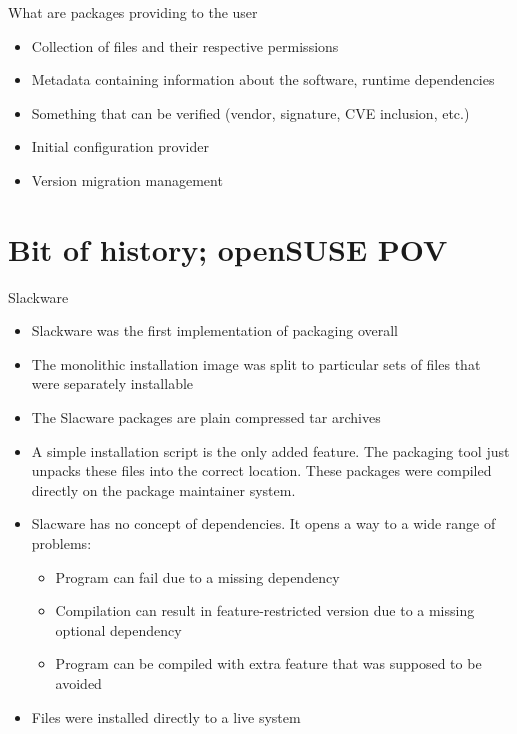 \documentclass{beamer}
\begin{document}
\begin{frame}[t]{What are packages providing to the user}
	\begin{itemize}
	\item Collection of files and their respective permissions
	\item Metadata containing information about the software, runtime dependencies
	\item Something that can be verified (vendor, signature, CVE inclusion, etc.)
	\item Initial configuration provider
	\item Version migration management
	\end{itemize}
\end{frame}

\section{Bit of history; openSUSE POV}

\begin{frame}[t]{Slackware}
	\begin{itemize}
	\item Slackware was the first implementation of packaging overall
	\item The monolithic installation image was split to particular sets of files that were separately installable
	\item The Slacware packages are plain compressed tar archives
	\item A simple installation script is the only added feature. The packaging tool just unpacks these files into the correct location. These packages were compiled directly on the package maintainer system.
    \item Slacware has no concept of dependencies. It opens a way to a wide range of problems:
    \begin{itemize}
    \item Program can fail due to a missing dependency
    \item Compilation can result in feature-restricted version due to a missing optional dependency
    \item Program can be compiled with extra feature that was supposed to be avoided
    \end{itemize}
    \item Files were installed directly to a live system
	\end{itemize}
\end{frame}
\end{document}
